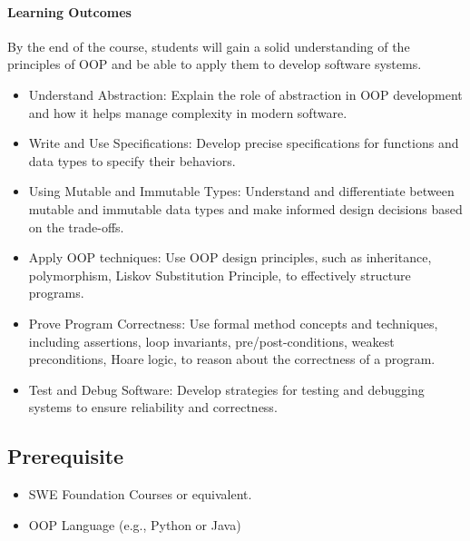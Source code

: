 \documentclass[11pt]{article}
\begin{document}
\paragraph{Learning Outcomes}
By the end of the course, students will gain a solid understanding of the principles of OOP and be able to apply them to develop software systems.
\begin{itemize}
\item Understand Abstraction: Explain the role of abstraction in OOP development and how it helps manage complexity in modern software.
\item Write and Use Specifications: Develop precise specifications for functions and data types to specify their behaviors.
\item Using Mutable and Immutable Types: Understand and differentiate between mutable and immutable data types and make informed design decisions based on the trade-offs.
\item Apply OOP techniques: Use OOP design principles, such as inheritance, polymorphism, Liskov Substitution Principle, to effectively structure programs.
\item Prove Program Correctness: Use formal method concepts and techniques, including assertions, loop invariants, pre/post-conditions, weakest preconditions, Hoare logic, to reason about the correctness of a program.
\item Test and Debug Software: Develop strategies for testing and debugging systems to ensure reliability and correctness.

\end{itemize}

\subsection{Prerequisite}
\begin{itemize}
\item SWE Foundation Courses or equivalent.
\item OOP Language (e.g., Python or Java)
\end{itemize}
\end{document}
